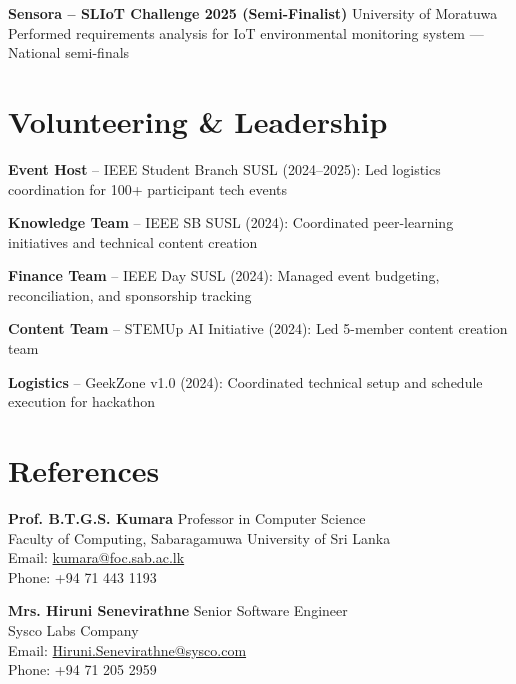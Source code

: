 \documentclass[letterpaper,10.8pt]{article}
\newenvironment{resume_list}{
  \vspace{-1pt}
  \begin{itemize}[itemsep=2pt, leftmargin=14pt]
}{
  \end{itemize}\vspace{-2pt}
}
\begin{document}
\vspace{5pt}
\noindent\textbf{Sensora – SLIoT Challenge 2025 (Semi-Finalist)} \hfill University of Moratuwa\\
Performed requirements analysis for IoT environmental monitoring system — National semi-finals

\section{Volunteering \& Leadership}
\vspace{-1pt}
\begin{resume_list}
  \item \textbf{Event Host} – IEEE Student Branch SUSL (2024–2025): Led logistics coordination for 100+ participant tech events
  \vspace{3pt}
  \item \textbf{Knowledge Team} – IEEE SB SUSL (2024): Coordinated peer-learning initiatives and technical content creation
  \vspace{3pt}
  \item \textbf{Finance Team} – IEEE Day SUSL (2024): Managed event budgeting, reconciliation, and sponsorship tracking
  \vspace{3pt}
  \item \textbf{Content Team} – STEMUp AI Initiative (2024): Led 5-member content creation team
  \vspace{3pt}
  \item \textbf{Logistics} – GeekZone v1.0 (2024): Coordinated technical setup and schedule execution for hackathon
\end{resume_list}

\vspace{-2pt}
\section{References}
\vspace{-1pt}

\noindent\textbf{Prof. B.T.G.S. Kumara} \hfill Professor in Computer Science\\
Faculty of Computing, Sabaragamuwa University of Sri Lanka\\
Email: \href{mailto:kumara@foc.sab.ac.lk}{kumara@foc.sab.ac.lk}\\
Phone: +94 71 443 1193

\vspace{8pt}
\noindent\textbf{Mrs. Hiruni Senevirathne} \hfill Senior Software Engineer\\
Sysco Labs Company\\
Email: \href{mailto:Hiruni.Senevirathne@sysco.com}{Hiruni.Senevirathne@sysco.com}\\
Phone: +94 71 205 2959
\end{document}
